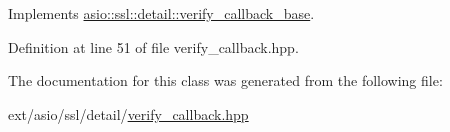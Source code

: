 Implements \hyperlink{classasio_1_1ssl_1_1detail_1_1verify__callback__base_a1b639922c74bd99d05a8b1fdda6cef3b}{asio\+::ssl\+::detail\+::verify\+\_\+callback\+\_\+base}.



Definition at line 51 of file verify\+\_\+callback.\+hpp.



The documentation for this class was generated from the following file\+:\begin{DoxyCompactItemize}
\item 
ext/asio/ssl/detail/\hyperlink{verify__callback_8hpp}{verify\+\_\+callback.\+hpp}\end{DoxyCompactItemize}
